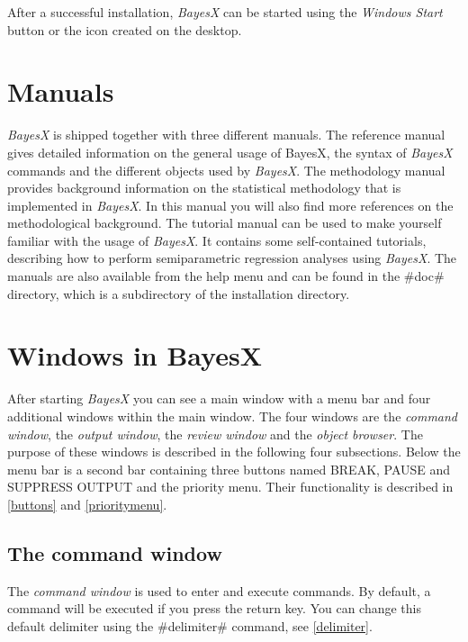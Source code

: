 After a successful installation, {\em BayesX} can be started using
the {\em Windows Start} button or the icon created on the desktop.

\section{Manuals}

{\em BayesX} is shipped together with three different manuals. The
reference manual gives detailed information on the general usage of
BayesX, the syntax of {\em BayesX} commands and the different
objects used by {\em BayesX}. The methodology manual provides
background information on the statistical methodology that is
implemented in {\em BayesX}. In this manual you will also find more
references on the methodological background. The tutorial manual can
be used to make yourself familiar with the usage of {\em BayesX}. It
contains some self-contained tutorials, describing how to perform
semiparametric regression analyses using {\em BayesX}. The manuals
are also available from the help menu and can be found in the #doc#
directory, which is a subdirectory of the installation directory.

\section{Windows in BayesX}

After starting {\em BayesX} you can see a main window with a menu
bar and four additional windows within the main window. The four
windows are the {\em command window}, the {\em output window}, the
{\em review window} and the {\em object browser}. The purpose of
these windows is described in the following four subsections.
Below the menu bar is a second bar containing three buttons named
BREAK, PAUSE and SUPPRESS OUTPUT and the priority menu. Their
functionality is described in \autoref{buttons} and
\autoref{prioritymenu}.

\subsection{The command window}

  The {\em command window}
is used to enter and execute commands. By default, a command will
be executed if you press the return key. You can change this
default delimiter using the #delimiter# command, see
\autoref{delimiter}.

